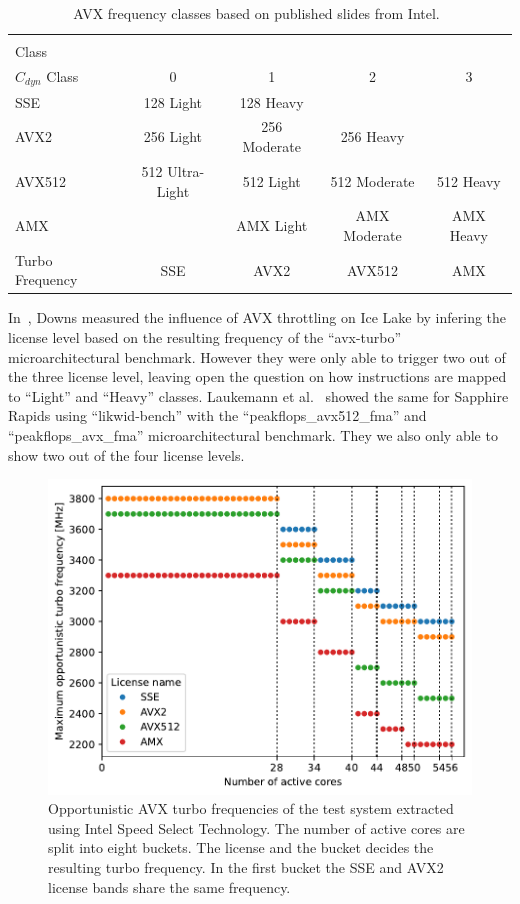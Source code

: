 \begin{table}[t]
	\centering
	\caption{\label{tab:avx-classes}AVX frequency classes based on published slides from Intel.~\cite{ServeTheHome_Emerald_Rapids_2023}}
	\begin{tabular}{|l|c|c|c|c|}
        \hline
        \diagbox[height=5em]{Instruction\\Class}{\\$C_{dyn}$ Class} & 0 & 1 & 2 & 3 \\
        \hline
        SSE & 128 Light & 128 Heavy & & \\
        AVX2 & 256 Light & 256 Moderate & 256 Heavy & \\
        AVX512 & 512 Ultra-Light & 512 Light & 512 Moderate & 512 Heavy \\
        AMX & & AMX Light & AMX Moderate & AMX Heavy \\
        \hline \hline
        Turbo Frequency & SSE & AVX2 & AVX512 & AMX \\ 
        \hline
	\end{tabular}
\end{table}

In~\cite{Downs_2020_AVX_Downclocking}, Downs measured the influence of AVX throttling on Ice Lake by infering the license level based on the resulting frequency of the ``avx-turbo'' microarchitectural benchmark.
However they were only able to trigger two out of the three license level, leaving open the question on how instructions are mapped to ``Light'' and ``Heavy'' classes.
Laukemann et al.~\cite{laukemann_microarchitectural_2024} showed the same for Sapphire Rapids using ``likwid-bench'' with the ``peakflops\_avx512\_fma'' and ``peakflops\_avx\_fma'' microarchitectural benchmark.
They we also only able to show two out of the four license levels.


\begin{figure}[]
    \centering
    \includegraphics[width=0.8\columnwidth]{fig/avx-frequency-license-bands.pdf}
    \caption{\label{fig:p0n-frequencies}Opportunistic AVX turbo frequencies of the test system extracted using Intel Speed Select Technology.
    The number of active cores are split into eight buckets. The license and the bucket decides the resulting turbo frequency.
    In the first bucket the SSE and AVX2 license bands share the same frequency.}
\end{figure}

